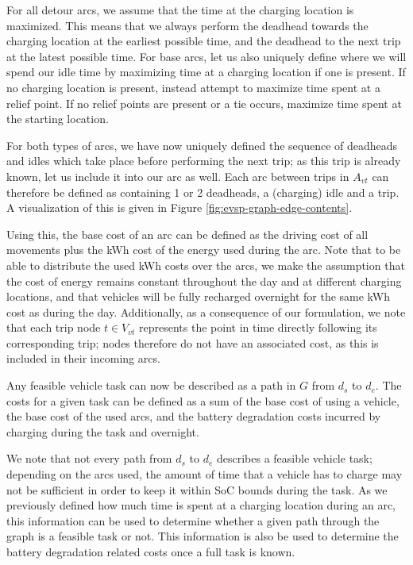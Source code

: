 \documentclass[]{article}
\begin{document}
For all detour arcs, we assume that the time at the charging location is maximized. This means that we always perform the deadhead towards the charging location at the earliest possible time, and the deadhead to the next trip at the latest possible time. For base arcs, let us also uniquely define where we will spend our idle time by maximizing time at a charging location if one is present. If no charging location is present, instead attempt to maximize time spent at a relief point. If no relief points are present or a tie occurs, maximize time spent at the starting location. 

For both types of arcs, we have now uniquely defined the sequence of deadheads and idles which take place before performing the next trip; as this trip is already known, let us include it into our arc as well. Each arc between trips in $A_{vt}$ can therefore be defined as containing 1 or 2 deadheads, a (charging) idle and a trip. A visualization of this is given in Figure \ref{fig:evsp-graph-edge-contents}. 

Using this, the base cost of an arc can be defined as the driving cost of all movements plus the kWh cost of the energy used during the arc. Note that to be able to distribute the used kWh costs over the arcs, we make the assumption that the cost of energy remains constant throughout the day and at different charging locations, and that vehicles will be fully recharged overnight for the same kWh cost as during the day. Additionally, as a consequence of our formulation, we note that each trip node $t \in V_{vt}$ represents the point in time directly following its corresponding trip; nodes therefore do not have an associated cost, as this is included in their incoming arcs. 

Any feasible vehicle task can now be described as a path in $G$ from $d_s$ to $d_e$. The costs for a given task can be defined as a sum of the base cost of using a vehicle, the base cost of the used arcs, and the battery degradation costs incurred by charging during the task and overnight.

We note that not every path from $d_s$ to $d_e$ describes a feasible vehicle task; depending on the arcs used, the amount of time that a vehicle has to charge may not be sufficient in order to keep it within SoC bounds during the task. As we previously defined how much time is spent at a charging location during an arc, this information can be used to determine whether a given path through the graph is a feasible task or not. This information is also be used to determine the battery degradation related costs once a full task is known.
\end{document}
